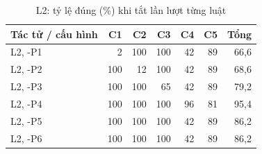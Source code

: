 \begin{table}[H]
  \centering
  \small
  \caption{L2: tỷ lệ đúng (\%) khi tắt lần lượt từng luật}
  \label{tab:cs-ct-l2}
  \begin{tabular}{lrrrrrr}
    \toprule
    Tác tử / cấu hình & C1 & C2 & C3 & C4 & C5 & Tổng \\
    \midrule
    L2, -P1 & 2 & 100 & 100 & 42 & 89 & 66,6 \\
    L2, -P2 & 100 & 12 & 100 & 42 & 89 & 68,6 \\
    L2, -P3 & 100 & 100 & 65 & 42 & 89 & 79,2 \\
    L2, -P4 & 100 & 100 & 100 & 96 & 81 & 95,4 \\
    L2, -P5 & 100 & 100 & 100 & 42 & 89 & 86,2 \\
    L2, -P6 & 100 & 100 & 100 & 42 & 89 & 86,2 \\
    \bottomrule
  \end{tabular}
\end{table}
